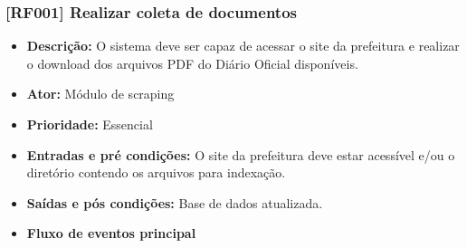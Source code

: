 \subsubsection{[RF001] Realizar coleta de documentos}
\begin{itemize}
   \item \textbf{Descrição:} O sistema deve ser capaz de acessar o site da prefeitura e realizar o download dos arquivos PDF do Diário Oficial disponíveis.
   \item \textbf{Ator:} Módulo de scraping
   \item \textbf{Prioridade:} Essencial
   \item \textbf{Entradas e pré condições:} O site da prefeitura deve estar acessível e/ou o diretório contendo os arquivos para indexação.
   \item \textbf{Saídas e pós condições:} Base de dados atualizada.
   \item \textbf{Fluxo de eventos principal}
 \end{itemize}

